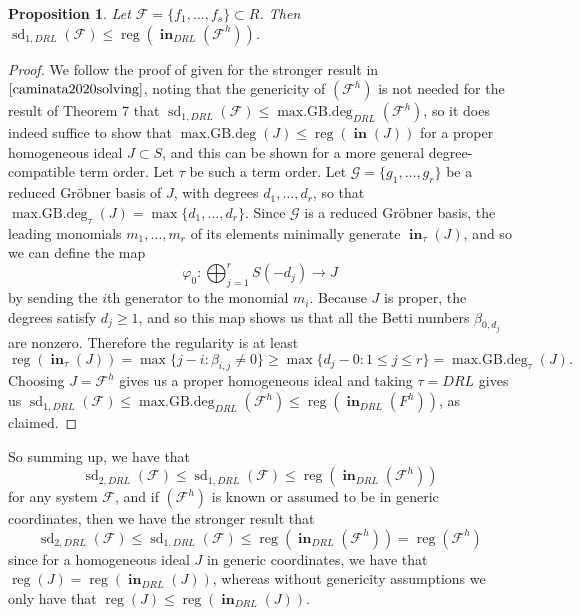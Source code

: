 \documentclass[11pt]{article}
\newcommand{\F}{\mathcal{F}}
\DeclareMathOperator{\Init}{\mathbf{in}}
\DeclareMathOperator{\sd}{sd}
\DeclareMathOperator{\reg}{reg}
\DeclareMathOperator{\mdeg}{max.GB.deg}
\newtheorem{proposition}{Proposition}
\theoremstyle{definition}
\begin{document}
\begin{proposition}
	Let $\F = \{f_1, \dots, f_s\} \subset R$. Then $\sd_{1,DRL}(\F) \leq \reg(\Init_{DRL}(\F^h))$. 
\end{proposition}

\begin{proof}
	We follow the proof of given for the stronger result in $\cite{caminata2020solving}$, noting that the genericity of $(\F^h)$ is not needed for the result of Theorem 7 that $\sd_{1,DRL}(\F) \leq \mdeg_{DRL}(\F^h)$, so it does indeed suffice to show that $\mdeg(J) \leq \reg(\Init(J))$ for a proper homogeneous ideal $J \subset S$, and this can be shown for a more general degree-compatible term order. Let $\tau$ be such a term order. Let $\mathcal{G} = \{g_1, \dots, g_r\}$ be a reduced Gröbner basis of $J$, with degrees $d_1, \dots, d_r$, so that $\mdeg_\tau(J) = \max\{d_1, \dots, d_r\}$. Since $\mathcal{G}$ is a reduced Gröbner basis, the leading monomials $m_1, \dots, m_r$ of its elements minimally generate $\Init_\tau(J)$, and so we can define the map \[ \varphi_0: \bigoplus_{j = 1}^r S(-d_j) \to J \] by sending the $i$th generator to the monomial $m_i$. Because $J$ is proper, the degrees satisfy $d_j \geq 1$, and so this map shows us that all the Betti numbers $\beta_{0,d_j}$ are nonzero. Therefore the regularity is at least \[ \reg(\Init_\tau(J)) = \max\{j - i : \beta_{i,j} \neq 0\} \geq \max\{d_j - 0 : 1 \leq j \leq r\} = \mdeg_\tau(J). \] Choosing $J = \F^h$ gives us a proper homogeneous ideal and taking $\tau = DRL$ gives us $\sd_{1,DRL}(\F) \leq \mdeg_{DRL}(\F^h) \leq \reg(\Init_{DRL}(F^h))$, as claimed. 
\end{proof}


So summing up, we have that \[ \sd_{2,DRL}(\F) \leq \sd_{1,DRL}(\F) \leq \reg(\Init_{DRL}(\F^h)) \] for any system $\F$, and if $(\F^h)$ is known or assumed to be in generic coordinates, then we have the stronger result that \[ \sd_{2,DRL}(\F) \leq \sd_{1,DRL}(\F) \leq \reg(\Init_{DRL}(\F^h)) = \reg(\F^h) \] since for a homogeneous ideal $J$ in generic coordinates, we have that $\reg(J) = \reg(\Init_{DRL}(J))$, whereas without genericity assumptions we only have that $\reg(J) \leq \reg(\Init_{DRL}(J))$.
\end{document}
